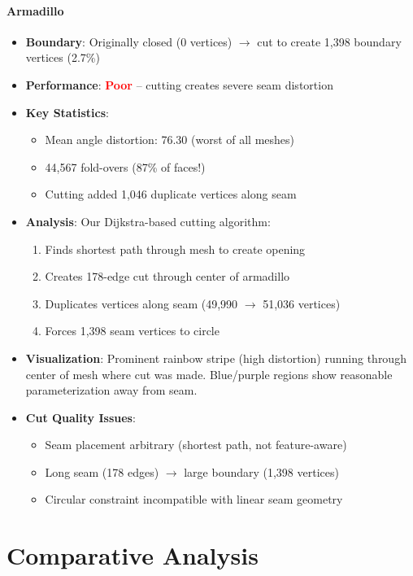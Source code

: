 \documentclass[11pt]{article}
\begin{document}
\paragraph{Armadillo}
\begin{itemize}
    \item \textbf{Boundary}: Originally closed (0 vertices) $\rightarrow$ cut to create 1,398 boundary vertices (2.7\%)
    \item \textbf{Performance}: \textcolor{red}{\textbf{Poor}} -- cutting creates severe seam distortion
    \item \textbf{Key Statistics}:
    \begin{itemize}
        \item Mean angle distortion: 76.30 (worst of all meshes)
        \item 44,567 fold-overs (87\% of faces!)
        \item Cutting added 1,046 duplicate vertices along seam
    \end{itemize}
    \item \textbf{Analysis}: Our Dijkstra-based cutting algorithm:
    \begin{enumerate}
        \item Finds shortest path through mesh to create opening
        \item Creates 178-edge cut through center of armadillo
        \item Duplicates vertices along seam (49,990 $\rightarrow$ 51,036 vertices)
        \item Forces 1,398 seam vertices to circle
    \end{enumerate}
    \item \textbf{Visualization}: Prominent rainbow stripe (high distortion) running through center of mesh where cut was made. Blue/purple regions show reasonable parameterization away from seam.
    \item \textbf{Cut Quality Issues}:
    \begin{itemize}
        \item Seam placement arbitrary (shortest path, not feature-aware)
        \item Long seam (178 edges) $\rightarrow$ large boundary (1,398 vertices)
        \item Circular constraint incompatible with linear seam geometry
    \end{itemize}
\end{itemize}

\section{Comparative Analysis}
\end{document}
